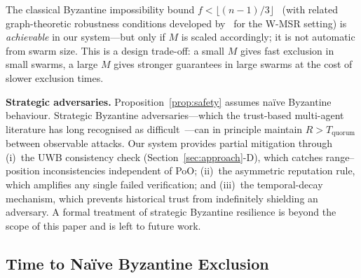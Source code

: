 \documentclass[conference,10pt]{IEEEtran}
\begin{document}
The classical Byzantine impossibility bound $f < \lfloor (n-1)/3 \rfloor$~\cite{lamport1982byzantine} (with related graph-theoretic robustness conditions developed by~\cite{leblanc2013resilient} for the W-MSR setting) is \emph{achievable} in our system---but only if $M$ is scaled accordingly; it is not automatic from swarm size. This is a design trade-off: a small $M$ gives fast exclusion in small swarms, a large $M$ gives stronger guarantees in large swarms at the cost of slower exclusion times.

\textbf{Strategic adversaries.} Proposition~\ref{prop:safety} assumes na\"ive Byzantine behaviour. Strategic Byzantine adversaries---which the trust-based multi-agent literature has long recognised as difficult~\cite{yemini2022characterizing,mallmanntrenn2022crowd}---can in principle maintain $R > T_\text{quorum}$ between observable attacks. Our system provides partial mitigation through (i)~the UWB consistency check (Section~\ref{sec:approach}-D), which catches range--position inconsistencies independent of PoO; (ii)~the asymmetric reputation rule, which amplifies any single failed verification; and (iii)~the temporal-decay mechanism, which prevents historical trust from indefinitely shielding an adversary. A formal treatment of strategic Byzantine resilience is beyond the scope of this paper and is left to future work.

\subsection{Time to Na\"ive Byzantine Exclusion}
\label{sec:time-byz-exclusion}
\end{document}
